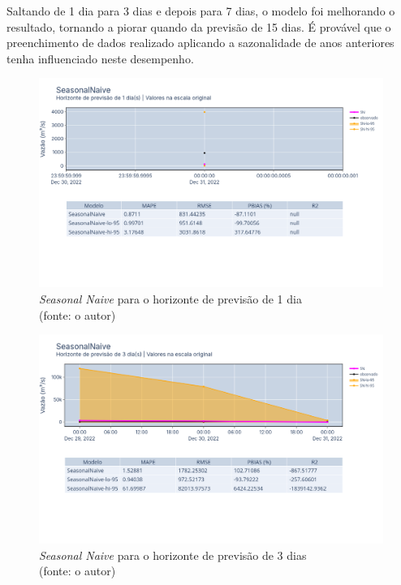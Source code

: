 Saltando de 1 dia para 3 dias e depois para 7 dias, o modelo foi melhorando o resultado, tornando a piorar quando da previsão de 15 dias. É provável que o preenchimento de dados realizado aplicando a sazonalidade de anos anteriores tenha influenciado neste desempenho.

\begin{figure}[!h]
	\centering
	\includegraphics[scale=0.33]{Figuras/jequiti/resultados/SeasonalNaive_fh1.png}
	\caption{\textit{Seasonal Naive} para o horizonte de previsão de 1 dia\\(fonte: o autor)}
	\label{fig:jequiti_SeasonalNaive_fh1}
\end{figure}

\begin{figure}[!h]
	\centering
	\includegraphics[scale=0.33]{Figuras/jequiti/resultados/SeasonalNaive_fh3.png}
	\caption{\textit{Seasonal Naive} para o horizonte de previsão de 3 dias\\(fonte: o autor)}
	\label{fig:jequiti_SeasonalNaive_fh3}
\end{figure}

